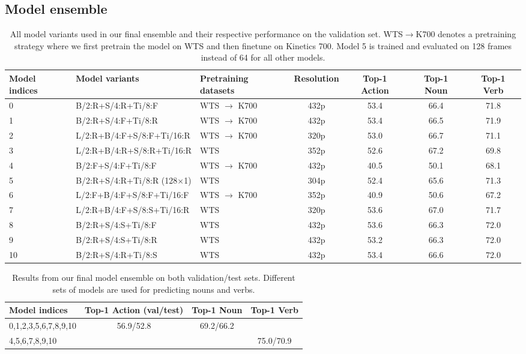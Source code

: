 \subsection{Model ensemble}
\label{sec:ensemble}
\begin{table*} 
	\centering
	\scriptsize{
\begin{tabular}{  l l  l c c  c c }
    \toprule
    Model indices & Model variants & Pretraining datasets & Resolution & Top-1 Action & Top-1 Noun & Top-1 Verb \\
    \midrule
    0 & B/2:R+S/4:R+Ti/8:F & WTS $\to$ K700 & 432p & 53.4 & 66.4 & 71.8 \\
    1 & B/2:R+S/4:F+Ti/8:R & WTS $\to$ K700 & 432p & 53.4 & 66.5 & 71.9 \\
    2 & L/2:R+B/4:F+S/8:F+Ti/16:R & WTS $\to$ K700 & 320p & 53.0 & 66.7 & 71.1 \\
    3 & L/2:R+B/4:R+S/8:R+Ti/16:R & WTS & 352p & 52.6 & 67.2 & 69.8 \\
    4 & B/2:F+S/4:F+Ti/8:F & WTS $\to$ K700 & 432p & 40.5 & 50.1 & 68.1 \\
    5 & B/2:R+S/4:R+Ti/8:R (128$\times$1) & WTS & 304p & 52.4 & 65.6 & 71.3 \\
    6 & L/2:F+B/4:F+S/8:F+Ti/16:F & WTS $\to$ K700 & 352p & 40.9 & 50.6 & 67.2 \\
    7 & L/2:R+B/4:F+S/8:S+Ti/16:R & WTS & 320p & 53.6 & 67.0 & 71.7 \\
    8 & B/2:R+S/4:S+Ti/8:F & WTS & 432p & 53.6 & 66.3 & 72.0 \\
    9 & B/2:R+S/4:S+Ti/8:R & WTS & 432p & 53.2 & 66.3 & 72.0 \\
    10 & B/2:R+S/4:R+Ti/8:S & WTS & 432p & 53.4 & 66.6 & 72.0 \\
    \bottomrule
   \end{tabular}
   }
	\caption{All model variants used in our final ensemble and their respective performance on the validation set. WTS$\to$K700 denotes a pretraining strategy where we first pretrain the model on WTS and then finetune on Kinetics 700. Model 5 is trained and evaluated on 128 frames instead of 64 for all other models.}
\label{tab:all_models}
\end{table*}
 \begin{table} 
	\centering
	\scriptsize{
\begin{tabular}{  l  c  c  c }
    \toprule
    Model indices & Top-1 Action (val/test) & Top-1 Noun & Top-1 Verb \\
    \midrule
    0,1,2,3,5,6,7,8,9,10 & \multirow{2}{*}{56.9/52.8} & 69.2/66.2 &  \\
    4,5,6,7,8,9,10 & &  & 75.0/70.9 \\
    \bottomrule
   \end{tabular}
   }
	\caption{Results from our final model ensemble on both validation/test sets. Different sets of models are used for predicting nouns and verbs.}
\label{tab:ensemble}
\end{table}
